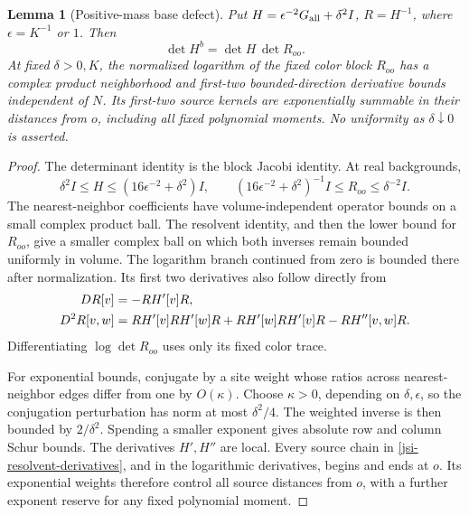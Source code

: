 \documentclass[11pt]{article}
\newtheorem{lemma}[theorem]{Lemma}
\theoremstyle{remark}
\begin{document}
\begin{lemma}[Positive-mass base defect]
\label{jsi-base-lemma}
Put \(H=\epsilon^{-2}G_{\rm all}+\delta^2I\), \(R=H^{-1}\),
where \(\epsilon=K^{-1}\) or \(1\). Then
\begin{equation}
       \det H^b=\det H\,\det R_{oo}.
 \label{jsi-jacobi}
\end{equation}
At fixed \(\delta>0,K\), the normalized logarithm of the fixed color
block \(R_{oo}\) has a complex product neighborhood and first-two
bounded-direction derivative bounds independent of \(N\).
Its first-two source kernels are exponentially summable in their
distances from \(o\), including all fixed polynomial moments.
No uniformity as \(\delta\downarrow0\) is asserted.
\end{lemma}

\begin{proof}
The determinant identity is the block Jacobi identity. At real
backgrounds,
\[
 \delta^2I\le H\le(16\epsilon^{-2}+\delta^2)I,
 \qquad
 (16\epsilon^{-2}+\delta^2)^{-1}I
                      \le R_{oo}\le\delta^{-2}I.
\]
The nearest-neighbor coefficients have volume-independent operator
bounds on a small complex product ball. The resolvent identity,
and then the lower bound for \(R_{oo}\), give a smaller complex
ball on which both inverses remain bounded uniformly in volume.
The logarithm branch continued from zero is bounded there after
normalization. Its first two derivatives also follow directly from
\begin{align}
 DR[v]&=-RH'[v]R,\notag\\
 D^2R[v,w]&=RH'[v]RH'[w]R+RH'[w]RH'[v]R-RH''[v,w]R.
 \label{jsi-resolvent-derivatives}
\end{align}
Differentiating \(\log\det R_{oo}\) uses only its fixed color trace.

For exponential bounds, conjugate by a site weight whose ratios
across nearest-neighbor edges differ from one by \(O(\kappa)\).
Choose \(\kappa>0\), depending on \(\delta,\epsilon\), so the
conjugation perturbation has norm at most \(\delta^2/4\).
The weighted inverse is then bounded by \(2/\delta^2\).
Spending a smaller exponent gives absolute row and column Schur
bounds. The derivatives \(H',H''\) are local. Every source chain
in \eqref{jsi-resolvent-derivatives}, and in the logarithmic
derivatives, begins and ends at \(o\). Its exponential weights
therefore control all source distances from \(o\), with a further
exponent reserve for any fixed polynomial moment.
\end{proof}
\end{document}

